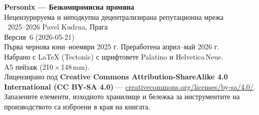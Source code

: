 \thispagestyle{empty}
\ifdefined\printmode\vspace*{\fill}\else{}\fi
\begin{flushleft}\small\sffamily
\textbf{Personix --- Безкомпромисна промяна}\\[0.3em]
Нецензурируема и неподкупна децентрализирана репутационна мрежа\\[1.4em]

\textcopyright\ 2025--2026 Pavel Kudrna, Прага\\[0.4em]

Версия~6 (2026-05-21)\\
Първа чернова юни--ноември 2025 г. Преработена април--май 2026 г.\\[1.4em]

Набрано с \LaTeX{} (Tectonic) с шрифтовете Palatino и Helvetica\,Neue.\\
A5 пейзаж (210\,$\times$\,148\,mm).\\[1.4em]

Лицензирано под \textbf{Creative Commons Attribution-ShareAlike 4.0
International (CC BY-SA 4.0)} ---
\href{https://creativecommons.org/licenses/by-sa/4.0/}{creativecommons.org/licenses/by-sa/4.0/}.
Запазените елементи, изходното хранилище и бележка за инструментите на
производството са изброени в края на книгата.
\end{flushleft}
\ifdefined\printmode\else{}\fi
\clearpage
